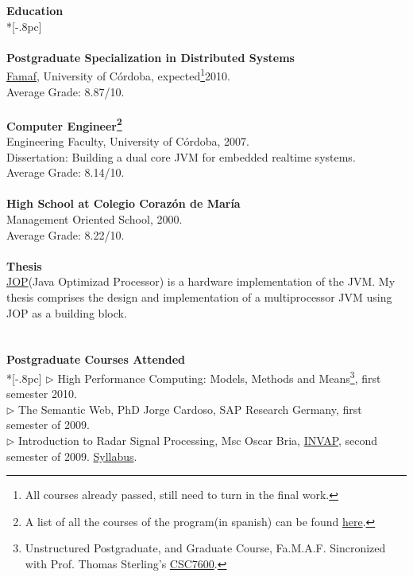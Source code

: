 \documentclass[a4paper,11pt,english]{article}
\begin{document}
{\large \bf Education} \\*[-.8pc]
\underline{\hspace{6in}} \\
\\
{\bf Postgraduate Specialization in Distributed Systems}\\
\href{http://www.famaf.unc.edu.ar/}{Famaf}, University of C\'ordoba, expected\footnote{All courses already passed, 
still need to turn in the final work.}2010. \\
Average Grade: 8.87/10. \\
\\
{\bf Computer Engineer\footnote{A list of all the courses of the program(in spanish) can be found 
\href{http://computacion.efn.uncor.edu/Plan-De-Estudios}{here}.} }\\
Engineering Faculty, University of C\'ordoba, 2007.\\
Dissertation: Building a dual core JVM for embedded realtime systems.\\
Average Grade: 8.14/10. \\
\\
{\bf High School at Colegio Coraz\'on de Mar\'ia}\\
Management Oriented School, 2000.\\
Average Grade: 8.22/10.\\
\\
{\bf Thesis} \\
\href{http://www.jopdesign.com}{JOP}(Java Optimizad Processor) is a hardware implementation of the JVM. My thesis 
comprises the design and implementation of a multiprocessor JVM using JOP as a building block.\\
 \\
 \\
{\large \bf Postgraduate Courses Attended}\\ *[-.8pc]
\underline{\hspace{6in}} 
$\triangleright$ High Performance Computing: Models, Methods and Means\footnote{Unstructured Postgraduate,
and Graduate Course, Fa.M.A.F. Sincronized with Prof. Thomas Sterling's 
\href{http://www.cct.lsu.edu/csc7600/Home.html}{CSC7600}.}, first semester 2010.\\
$\triangleright$ The Semantic Web, PhD Jorge Cardoso, SAP Research Germany, first semester of 2009.\\
$\triangleright$ Introduction to Radar Signal Processing, Msc Oscar Bria, 
\href{http://www.invap.net/index-e.php}{INVAP}, second semester of 2009. \href{http://postgrado.info.unlp.edu.ar/Carrera/Programas/Contenidos_IPSR.pdf}{Syllabus}.\\
\end{document}
